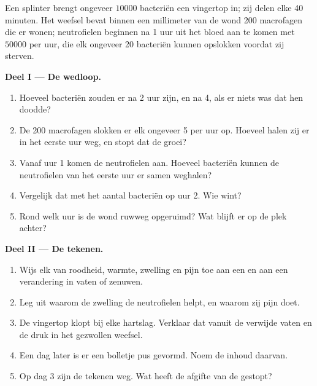 \begin{problem}
\label{pb:g12:innate-immunity:1}
Een splinter brengt ongeveer $\num{10000}$ bacteriën een vingertop in; zij
delen elke 40 minuten. Het weefsel bevat binnen een millimeter van de wond
200 macrofagen die er wonen; neutrofielen beginnen na 1 uur uit het bloed
aan te komen met $\num{50000}$ per uur, die elk ongeveer 20 bacteriën
kunnen opslokken voordat zij sterven.

\medskip
\noindent\textbf{Deel I --- De wedloop.}
\begin{enumerate}
  \item Hoeveel bacteriën zouden er na 2 uur zijn, en na 4, als er niets
        was dat hen doodde?
  \item De 200 macrofagen slokken er elk ongeveer 5 per uur op. Hoeveel
        halen zij er in het eerste uur weg, en stopt dat de groei?
  \item Vanaf uur 1 komen de neutrofielen aan. Hoeveel bacteriën kunnen de
        neutrofielen van het eerste uur er samen weghalen?
  \item Vergelijk dat met het aantal bacteriën op uur 2. Wie wint?
  \item Rond welk uur is de wond ruwweg opgeruimd? Wat blijft er op de
        plek achter?
\end{enumerate}

\medskip
\noindent\textbf{Deel II --- De tekenen.}
\begin{enumerate}[resume]
  \item Wijs elk van roodheid, warmte, zwelling en pijn toe aan een
         en aan een verandering in vaten of zenuwen.
  \item Leg uit waarom de zwelling de neutrofielen helpt, en waarom zij
        pijn doet.
  \item De vingertop klopt bij elke hartslag. Verklaar dat vanuit de
        verwijde vaten en de druk in het gezwollen weefsel.
  \item Een dag later is er een bolletje pus gevormd. Noem de inhoud
        daarvan.
  \item Op dag 3 zijn de tekenen weg. Wat heeft de afgifte van de
         gestopt?
\end{enumerate}


\end{problem}
